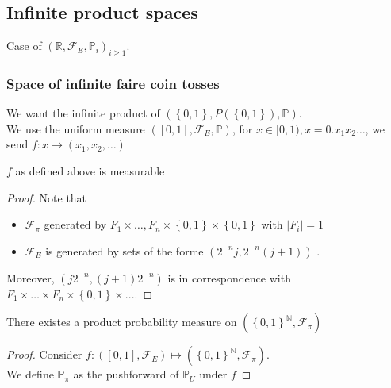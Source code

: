 \documentclass[../main.tex]{subfiles}
\begin{document}
\subsection{Infinite product spaces}
Case of $ ( \mathbb{R}, \mathcal{F}_E, \mathbb{P}_i)_{i \geq 1} $.\\
\subsubsection*{Space of infinite faire coin tosses}
We want the infinite product of $ ( \left\{ 0,1 \right\} , P(  \left\{ 0,1 \right\} ) , \mathbb{P}) $.\\
We use the uniform measure $ ( [ 0,1] , \mathcal{F}_E, \mathbb{P}) $, for $ x\in [ 0,1),  x= 0.x_1x_2\ldots $, we send $f:x \to ( x_1, x_2, \ldots) $ 
\begin{lemma}
	$f$ as defined above is measurable
\end{lemma}
\begin{proof}


Note that
\begin{itemize}
\item $\mathcal{F}_\pi$ generated by $ F_1\times\ldots,F_n\times \left\{ 0,1 \right\} \times \left\{ 0,1 \right\} $ with $ |F_i|=1$ 
\item $\mathcal{F}_E$ is generated by sets of the forme $ ( 2^{-n}j , 2^{-n}( j+1) ) $ .
\end{itemize}
Moreover, $ ( j2^{-n}, ( j+1) 2^{-n}) $ is in correspondence with $F_1\times\ldots\times F_n \times \left\{ 0,1 \right\} \times ...$.

\end{proof}
\begin{propo}
	There existes a product probability measure on $ ( \left\{ 0,1 \right\} ^{\mathbb{N}}, \mathcal{F}_\pi) $ 
\end{propo}
\begin{proof}
	Consider $ f: ( [ 0,1] , \mathcal{F}_E) \mapsto (  \left\{ 0,1 \right\}^{\mathbb{N}}, \mathcal{F}_\pi) $.\\
	We define $\mathbb{P}_\pi$ as the pushforward of $ \mathbb{P}_U$ under $f$ 	
\end{proof}

		
\end{document}

